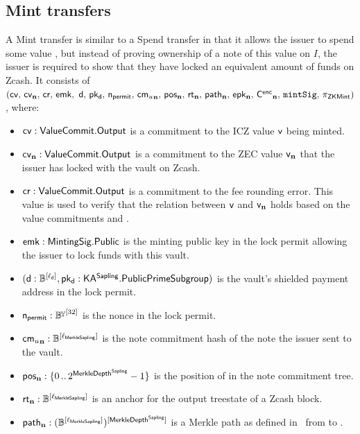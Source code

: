 \subsection{Mint transfers}
\label{sec:mint_transfers}
A Mint transfer is similar to a Spend transfer in that it allows the issuer to spend some value \val, but instead of proving ownership of a note of this value on $I$, the issuer is required to show that they have locked an equivalent amount of funds on Zcash.
It consists of $(\mathsf{cv},\, \mathsf{cv_{\mathbf{n}}},\, \mathsf{cr},\, \mathsf{emk},\,\, \mathsf{d},\, \mathsf{pk_d},\, \mathsf{n_{permit}},\, \mathsf{{cm_{\mathnormal{u}}}_{\mathbf{n}}},\, \mathsf{pos_{\mathbf{n}}},\, \mathsf{rt_{\mathbf{n}}},\, \mathsf{path_{\mathbf{n}}},\, \mathsf{epk_{\mathbf{n}}},\, \mathsf{{C^{enc}}_{\mathbf{n}}},\, \mathtt{mintSig},\, \pi_{\mathsf{ZKMint}})$, where:
\begin{itemize}
    \item $\mathsf{cv} : \mathsf{ValueCommit}.\mathsf{Output}$ is a commitment to the ICZ value $\mathsf{v}$ being minted.
    
    \item $\mathsf{cv_{\mathbf{n}}} : \mathsf{ValueCommit}.\mathsf{Output}$ is a commitment to the ZEC value $\mathsf{v_{\mathbf{n}}}$ that the issuer has locked with the vault on Zcash.
    
    \item $\mathsf{cr} : \mathsf{ValueCommit}.\mathsf{Output}$ is a commitment to the fee rounding error.
    This value is used to verify that the relation between $\mathsf{v}$ and $\mathsf{v_{\mathbf{n}}}$ holds based on the value commitments \cv and \cvn.
    
    \item $\mathsf{emk} : \mathsf{MintingSig}.\mathsf{Public}$ is the minting public key in the lock permit allowing the issuer to lock funds with this vault.
    
    \item $(\mathsf{d} : \mathbb{B}^{[\ell_{\mathsf{d}}]}, \mathsf{pk_d} : \mathsf{KA^{Sapling}}.\mathsf{PublicPrimeSubgroup})$ is the vault's shielded payment address in the lock permit.
    
    \item $\nlock : \By^{[32]}$ is the nonce in the lock permit.
    
    \item $\mathsf{{cm_{\mathnormal{u}}}_{\mathbf{n}}} : \mathbb{B}^{[\ell_{\mathsf{MerkleSapling}}]}$ is the note commitment hash of the note the issuer sent to the vault.
    
    \item $\mathsf{pos_{\mathbf{n}}} : \{0\,..\,2^{\mathsf{MerkleDepth^{Sapling}}} - 1\}$ is the position of \cmun in the note commitment tree.
    
    \item $\mathsf{rt_{\mathbf{n}}} : \mathbb{B}^{[\ell_{\mathsf{MerkleSapling}}]}$ is an anchor for the output treestate of a Zcash block.
    
    \item $\mathsf{path_{\mathbf{n}}} : (\mathbb{B}^{[\ell_{\mathsf{MerkleSapling}}]})^{[\mathsf{MerkleDepth^{Sapling}}]}$ is a Merkle path as defined in~\cite[Section 4.8]{hopwood2016zcash} from \cmun to \rtn.
    

\end{itemize}
